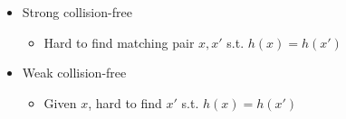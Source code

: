 \begin{itemize}
\item Strong collision-free
    \begin{itemize}
    \item Hard to find matching pair $x,x'$ s.t. $h(x)=h(x')$
    \end{itemize}
\item Weak collision-free
    \begin{itemize}
    \item Given $x$, hard to find $x'$ s.t. $h(x)=h(x')$
    \end{itemize}
\end{itemize}
